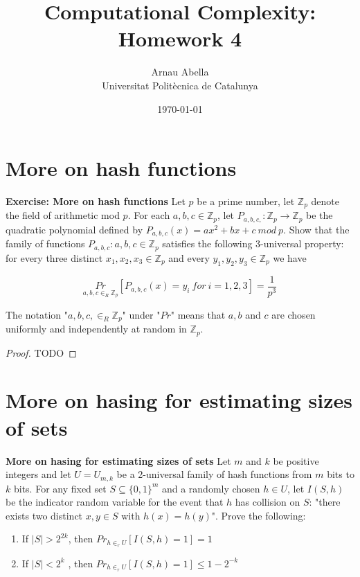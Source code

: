 \documentclass[12pt, a4paper]{article} %
\title{%
  Computational Complexity: Homework 4
}
\author{%
  Arnau Abella \\
  \large{Universitat Polit\`ecnica de Catalunya}
}
\date{\today}
\newcommand{\Z}{\mathbb{Z}}
\begin{document}
\maketitle


\section{More on hash functions}

\textbf{Exercise: More on hash functions} \quad Let $p$ be a prime number, let $\Z_p$ denote the field of arithmetic mod $p$. For each $a,b,c \in \Z_p$, let ${P_{a,b,c,} : \Z_p \to \Z_p}$ be the quadratic polynomial defined by $P_{a,b,c}(x) = ax^2 + bx + c \ mod \ p$. Show that the family of functions ${ P_{a,b,c}: a,b,c \in \Z_p}$ satisfies the following 3-universal property: for every three distinct $x_1, x_2, x_3 \in \Z_p$ and every $y_1, y_2, y_3 \in \Z_p$ we have

\begin{equation}\label{eq:one}
  \underset{a,b,c \in_R \Z_p}{Pr} [ P_{a,b,c}(x) = y_i \ for \ i = 1,2,3] = \frac{1}{p^3}
\end{equation}

The notation "$a,b,c, \in_R \Z_p$" under "$Pr$" means that $a,b$ and $c$ are chosen uniformly and independently at random in $\Z_p$.


\begin{proof}

  TODO

\end{proof}


\section{More on hasing for estimating sizes of sets}

\textbf{More on hasing for estimating sizes of sets} \quad Let $m$ and $k$ be positive integers and let $U = U_{m,k}$ be a 2-universal family of hash functions from $m$ bits to $k$ bits. For any fixed set $S \subseteq \{0,1\}^m$ and a randomly chosen $h \in U$, let $I(S,h)$ be the indicator random variable for the event that $h$ has collision on $S$: "there exists two distinct $x,y \in S$ with $h(x) = h(y)$". Prove the following:

\begin{enumerate}
  \item If $|S| > 2^{2k}$, then $Pr_{h \in_r U} [I(S,h) = 1] = 1$
  \item If $|S| < 2^{k}$ , then $Pr_{h \in_r U} [I(S,h) = 1] \leq 1 - 2^{-k}$
\end{enumerate}
\end{document}
